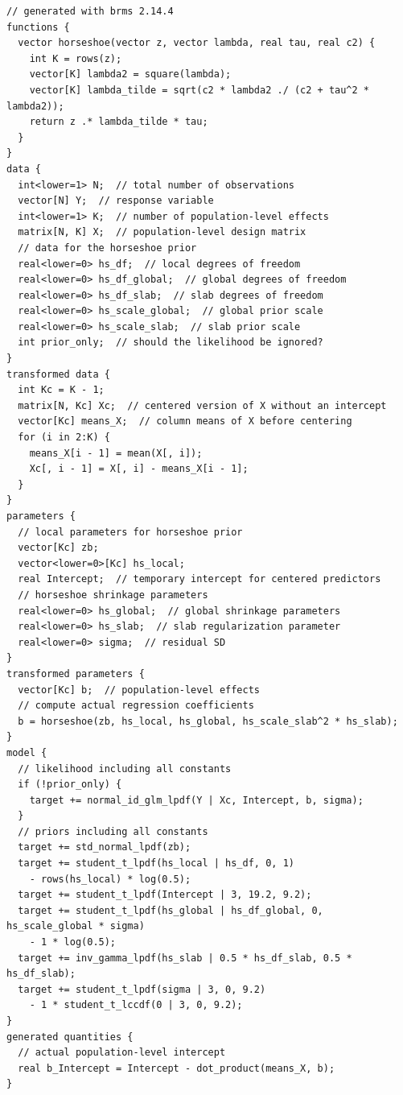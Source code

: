 \documentclass[english,t]{beamer}
\begin{document}
\begin{frame}[fragile]
\begin{verbatim}
// generated with brms 2.14.4
functions {
  vector horseshoe(vector z, vector lambda, real tau, real c2) {
    int K = rows(z);
    vector[K] lambda2 = square(lambda);
    vector[K] lambda_tilde = sqrt(c2 * lambda2 ./ (c2 + tau^2 * lambda2));
    return z .* lambda_tilde * tau;
  }
}
data {
  int<lower=1> N;  // total number of observations
  vector[N] Y;  // response variable
  int<lower=1> K;  // number of population-level effects
  matrix[N, K] X;  // population-level design matrix
  // data for the horseshoe prior
  real<lower=0> hs_df;  // local degrees of freedom
  real<lower=0> hs_df_global;  // global degrees of freedom
  real<lower=0> hs_df_slab;  // slab degrees of freedom
  real<lower=0> hs_scale_global;  // global prior scale
  real<lower=0> hs_scale_slab;  // slab prior scale
  int prior_only;  // should the likelihood be ignored?
}
transformed data {
  int Kc = K - 1;
  matrix[N, Kc] Xc;  // centered version of X without an intercept
  vector[Kc] means_X;  // column means of X before centering
  for (i in 2:K) {
    means_X[i - 1] = mean(X[, i]);
    Xc[, i - 1] = X[, i] - means_X[i - 1];
  }
}
parameters {
  // local parameters for horseshoe prior
  vector[Kc] zb;
  vector<lower=0>[Kc] hs_local;
  real Intercept;  // temporary intercept for centered predictors
  // horseshoe shrinkage parameters
  real<lower=0> hs_global;  // global shrinkage parameters
  real<lower=0> hs_slab;  // slab regularization parameter
  real<lower=0> sigma;  // residual SD
}
transformed parameters {
  vector[Kc] b;  // population-level effects
  // compute actual regression coefficients
  b = horseshoe(zb, hs_local, hs_global, hs_scale_slab^2 * hs_slab);
}
model {
  // likelihood including all constants
  if (!prior_only) {
    target += normal_id_glm_lpdf(Y | Xc, Intercept, b, sigma);
  }
  // priors including all constants
  target += std_normal_lpdf(zb);
  target += student_t_lpdf(hs_local | hs_df, 0, 1)
    - rows(hs_local) * log(0.5);
  target += student_t_lpdf(Intercept | 3, 19.2, 9.2);
  target += student_t_lpdf(hs_global | hs_df_global, 0, hs_scale_global * sigma)
    - 1 * log(0.5);
  target += inv_gamma_lpdf(hs_slab | 0.5 * hs_df_slab, 0.5 * hs_df_slab);
  target += student_t_lpdf(sigma | 3, 0, 9.2)
    - 1 * student_t_lccdf(0 | 3, 0, 9.2);
}
generated quantities {
  // actual population-level intercept
  real b_Intercept = Intercept - dot_product(means_X, b);
}
\end{verbatim}

\end{frame}
\end{document}
